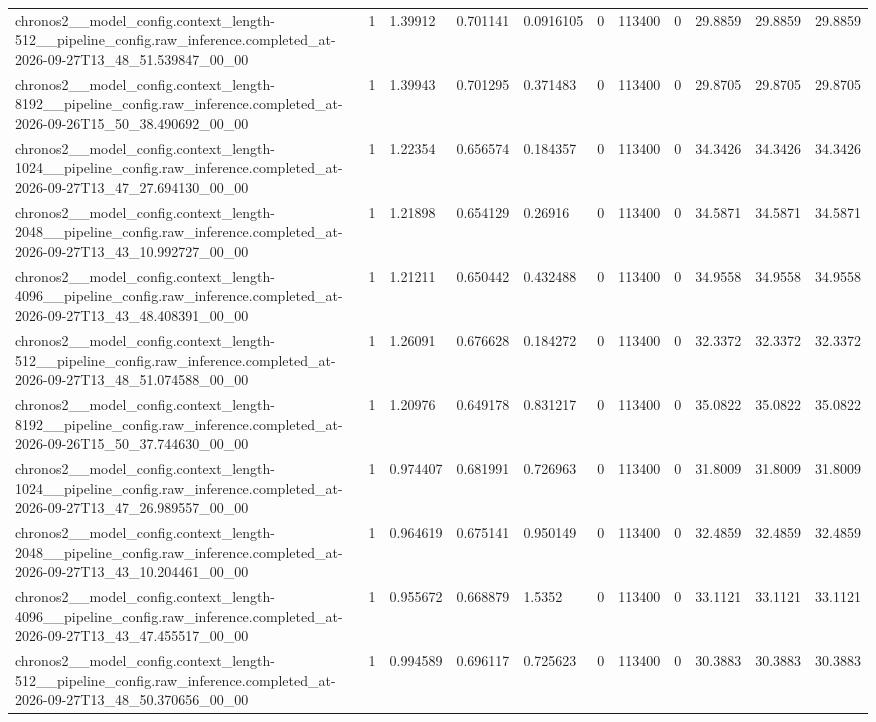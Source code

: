 \begin{tabular}{lllllllllll}
chronos2\_\_model\_config.context\_length-512\_\_pipeline\_config.raw\_inference.completed\_at-2026-09-27T13\_48\_51.539847\_00\_00 & 1 & 1.39912 & 0.701141 & 0.0916105 & 0 & 113400 & 0 & 29.8859 & 29.8859 & 29.8859 \\
chronos2\_\_model\_config.context\_length-8192\_\_pipeline\_config.raw\_inference.completed\_at-2026-09-26T15\_50\_38.490692\_00\_00 & 1 & 1.39943 & 0.701295 & 0.371483 & 0 & 113400 & 0 & 29.8705 & 29.8705 & 29.8705 \\
chronos2\_\_model\_config.context\_length-1024\_\_pipeline\_config.raw\_inference.completed\_at-2026-09-27T13\_47\_27.694130\_00\_00 & 1 & 1.22354 & 0.656574 & 0.184357 & 0 & 113400 & 0 & 34.3426 & 34.3426 & 34.3426 \\
chronos2\_\_model\_config.context\_length-2048\_\_pipeline\_config.raw\_inference.completed\_at-2026-09-27T13\_43\_10.992727\_00\_00 & 1 & 1.21898 & 0.654129 & 0.26916 & 0 & 113400 & 0 & 34.5871 & 34.5871 & 34.5871 \\
chronos2\_\_model\_config.context\_length-4096\_\_pipeline\_config.raw\_inference.completed\_at-2026-09-27T13\_43\_48.408391\_00\_00 & 1 & 1.21211 & 0.650442 & 0.432488 & 0 & 113400 & 0 & 34.9558 & 34.9558 & 34.9558 \\
chronos2\_\_model\_config.context\_length-512\_\_pipeline\_config.raw\_inference.completed\_at-2026-09-27T13\_48\_51.074588\_00\_00 & 1 & 1.26091 & 0.676628 & 0.184272 & 0 & 113400 & 0 & 32.3372 & 32.3372 & 32.3372 \\
chronos2\_\_model\_config.context\_length-8192\_\_pipeline\_config.raw\_inference.completed\_at-2026-09-26T15\_50\_37.744630\_00\_00 & 1 & 1.20976 & 0.649178 & 0.831217 & 0 & 113400 & 0 & 35.0822 & 35.0822 & 35.0822 \\
chronos2\_\_model\_config.context\_length-1024\_\_pipeline\_config.raw\_inference.completed\_at-2026-09-27T13\_47\_26.989557\_00\_00 & 1 & 0.974407 & 0.681991 & 0.726963 & 0 & 113400 & 0 & 31.8009 & 31.8009 & 31.8009 \\
chronos2\_\_model\_config.context\_length-2048\_\_pipeline\_config.raw\_inference.completed\_at-2026-09-27T13\_43\_10.204461\_00\_00 & 1 & 0.964619 & 0.675141 & 0.950149 & 0 & 113400 & 0 & 32.4859 & 32.4859 & 32.4859 \\
chronos2\_\_model\_config.context\_length-4096\_\_pipeline\_config.raw\_inference.completed\_at-2026-09-27T13\_43\_47.455517\_00\_00 & 1 & 0.955672 & 0.668879 & 1.5352 & 0 & 113400 & 0 & 33.1121 & 33.1121 & 33.1121 \\
chronos2\_\_model\_config.context\_length-512\_\_pipeline\_config.raw\_inference.completed\_at-2026-09-27T13\_48\_50.370656\_00\_00 & 1 & 0.994589 & 0.696117 & 0.725623 & 0 & 113400 & 0 & 30.3883 & 30.3883 & 30.3883 \\

\end{tabular}
